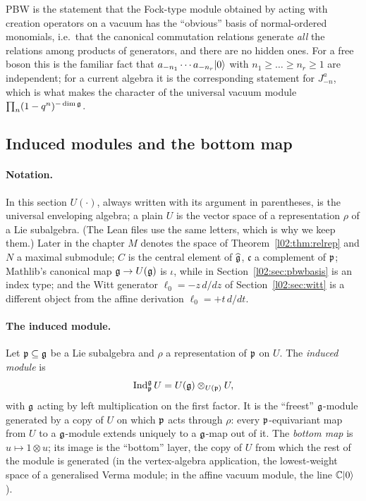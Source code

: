 \begin{physics}
PBW is the statement that the Fock-type module obtained by acting with creation operators on a
vacuum has the ``obvious'' basis of normal-ordered monomials, i.e.\ that the canonical commutation
relations generate \emph{all} the relations among products of generators, and there are no hidden
ones. For a free boson this is the familiar fact that $a_{-n_1}\cdots a_{-n_r}|0\rangle$ with
$n_1\ge\dots\ge n_r\ge1$ are independent; for a current algebra it is the corresponding statement for
$J^{a}_{-n}$, which is what makes the character of the universal vacuum module
$\prod_n(1-q^n)^{-\dim\mathfrak{g}}$.
\end{physics}

\subsection{Induced modules and the bottom map}\label{l02:sec:induced}

\paragraph{Notation.} In this section $U(\cdot)$, always written with its argument in parentheses, is the
universal enveloping algebra; a plain $U$ is the vector space of a representation $\rho$ of a Lie
subalgebra. (The Lean files use the same letters, which is why we keep them.) Later in the chapter $M$
denotes the space of Theorem~\ref{l02:thm:relrep} and $N$ a maximal submodule; $C$ is the central element
of $\widehat{\mathfrak{g}}$, $\mathfrak c$ a complement of $\mathfrak{p}$; Mathlib's canonical map $\mathfrak{g}\to U(\mathfrak{g})$ is $\iota$,
while  in Section~\ref{l02:sec:pbwbasis} is an index type; and the Witt generator $\ell_0 = -z\,d/dz$
of Section~\ref{l02:sec:witt} is a different object from the affine derivation $\ell_0 = +t\,d/dt$.

\paragraph{The induced module.} Let $\mathfrak{p}\subseteq\mathfrak{g}$ be a Lie subalgebra and $\rho$ a representation of
$\mathfrak{p}$ on $U$. The \emph{induced module} is
\begin{equation*}
 \operatorname{Ind}_{\mathfrak{p}}^{\mathfrak{g}}U = U(\mathfrak{g})\otimes_{U(\mathfrak{p})}U,
\end{equation*}
with $\mathfrak{g}$ acting by left multiplication on the first factor. It is the ``freest'' $\mathfrak{g}$-module
generated by a copy of $U$ on which $\mathfrak{p}$ acts through $\rho$: every $\mathfrak{p}$-equivariant map from $U$
to a $\mathfrak{g}$-module extends uniquely to a $\mathfrak{g}$-map out of it. The \emph{bottom map} is
$u\mapsto1\otimes u$; its image is the ``bottom'' layer, the copy of $U$ from which the rest of the module is
generated (in the vertex-algebra application, the lowest-weight space of a generalised Verma module;
in the affine vacuum module, the line ${\mathbb{C}}|0\rangle$).

